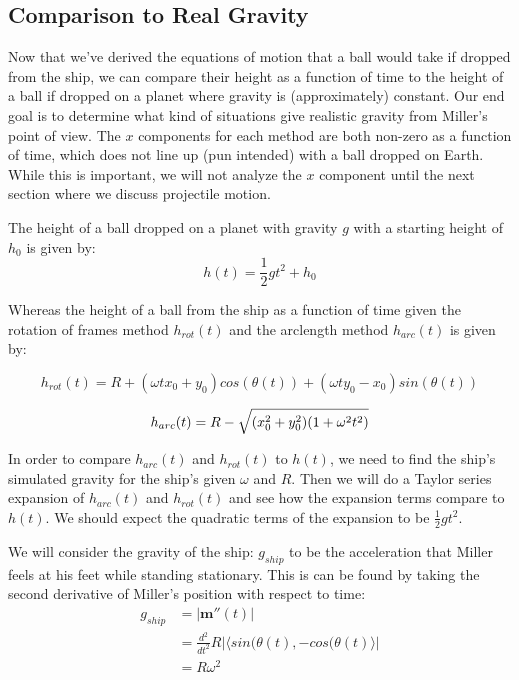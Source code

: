 \documentclass{amsart}
\renewcommand{\vec}{\textbf}
\theoremstyle{definition}
\begin{document}
\subsection*{Comparison to Real Gravity}

Now that we've derived the equations of motion that a ball would take
if dropped from the ship, we can compare their height as a function of
time to the height of a ball if dropped on a planet where gravity is
(approximately) constant. Our end goal is to determine what kind of
situations give realistic gravity from Miller's point of view. The $x$
components for each method are both non-zero as a function of time,
which does not line up (pun intended) with a ball dropped on
Earth. While this is important, we will not analyze the $x$ component
until the next section where we discuss projectile motion.

The height of a ball dropped on a planet with gravity $g$ with a starting height of $h_0$ is given by:
\begin{equation}
    h(t)=\frac{1}{2}gt^2 +h_0
\end{equation}

Whereas the height of a ball from the ship as a function of time given the rotation of frames method $h_{rot}(t)$ and the arclength method $h_{arc}(t)$ is given by:

\begin{equation}
    h_{rot}(t) = R+(\omega t x_0 + y_0)cos(\theta(t))+(\omega t y_0 - x_0)sin(\theta (t))
\end{equation}

\begin{equation}
    h_{arc}(t) = R - \sqrt{(x_0^2+y_0^2)(1+\omega^2 t^2)} \\
\end{equation}

In order to compare $h_{arc}(t)$ and $h_{rot}(t)$ to $h(t)$, we need to find the ship's simulated gravity for the ship's given $\omega$ and $R$. Then we will do a Taylor series expansion of $h_{arc}(t)$ and $h_{rot}(t)$ and see how the expansion terms compare to $h(t)$. We should expect the quadratic terms of the expansion to be $\frac{1}{2}gt^2$.

We will consider the gravity of the ship: $g_{ship}$  to be the acceleration that Miller feels at his feet while standing stationary. This is can be found by taking the second derivative of Miller's position with respect to time:
\begin{equation}
\begin{split}
     g_{ship}&=\lvert\vec{m}''(t)\rvert \\
     &= \frac{d^2}{dt^2}R\lvert \langle sin(\theta(t),-cos(\theta(t)\rangle \rvert \\
     &=R \omega^2
\end{split}
\end{equation}
\end{document}
